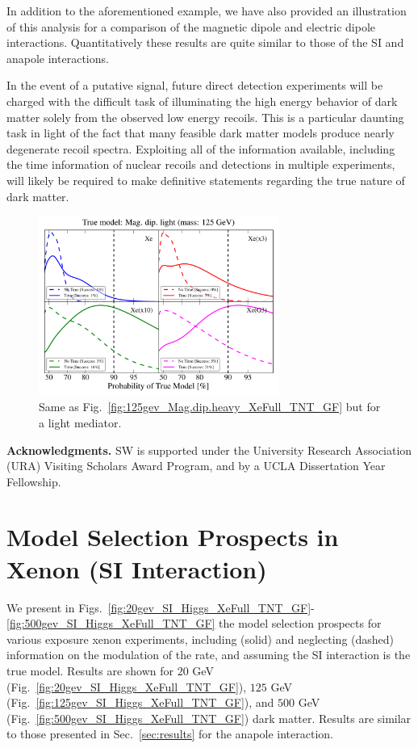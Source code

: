\documentclass[11pt]{article}
\newcommand{\Sec}[1]{Sec.~\ref{#1}} \newcommand{\Secs}[2]{Secs.~\ref{#1} and \ref{#2}} \newcommand{\Secm}[2]{Secs.~\ref{#1} through \ref{#2}}
\newcommand{\Fig}[1]{Fig.~\ref{#1}} \newcommand{\Figs}[2]{Figs.~\ref{#1} and \ref{#2}}
\begin{document}
In addition to the aforementioned example, we have also provided an illustration of this analysis for a comparison of the magnetic dipole and electric dipole interactions. Quantitatively these results are quite similar to those of the SI and anapole interactions.

In the event of a putative signal, future direct detection experiments will be charged with the difficult task of illuminating the high energy behavior of dark matter solely from the observed low energy recoils. This is a particular daunting task in light of the fact that many feasible dark matter models produce nearly degenerate recoil spectra. Exploiting all of the information available, including the time information of nuclear recoils and detections in multiple experiments, will likely be required to make definitive statements regarding the true nature of dark matter.

\begin{figure}
\centering
\includegraphics[width=0.7\textwidth]{plots/PDF_125GeV_Magdiplight_50sims_Xe_Xe3x_Xe10x_XeG3_GF_TNT.pdf}
\caption{\label{fig:125gev_Mag.dip.light_XeFull_TNT_GF}
Same as \Fig{fig:125gev_Mag.dip.heavy_XeFull_TNT_GF} but for a light mediator. }
\end{figure}


\bigskip

\textbf{Acknowledgments.} SW is supported under the University Research Association (URA) Visiting Scholars Award Program, and by a UCLA Dissertation Year Fellowship. %

\appendix

\section{Model Selection Prospects in Xenon (SI Interaction)}
We present in Figs.~\ref{fig:20gev_SI_Higgs_XeFull_TNT_GF}-\ref{fig:500gev_SI_Higgs_XeFull_TNT_GF} the model selection prospects for various exposure xenon experiments, including (solid) and neglecting (dashed) information on the modulation of the rate, and assuming the SI interaction is the true model. Results are shown for $20$ GeV (\Fig{fig:20gev_SI_Higgs_XeFull_TNT_GF}), $125$ GeV (\Fig{fig:125gev_SI_Higgs_XeFull_TNT_GF}), and $500$ GeV (\Fig{fig:500gev_SI_Higgs_XeFull_TNT_GF}) dark matter. Results are similar to those presented in \Sec{sec:results} for the anapole interaction. 
\end{document}
